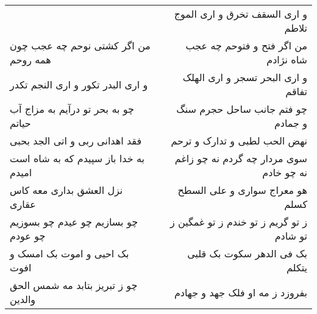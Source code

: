 \begin{center}
\begin{longtable}{l p{0.5cm} r}
&&
و اری السقف تخرق و اری الموج تلاطم
\\
من اگر کشتی نوحم چه عجب چون همه روحم
&&
من اگر فتح و فتوحم چه عجب شاه نژادم
\\
و اری البدر تکور و اری النجم تکدر
&&
و اری البحر تسجر و اری الهلک تفاقم
\\
چو به بحر تو درآیم به مزاج آب حیاتم
&&
چو فتم جانب ساحل حجرم سنگ و جمادم
\\
فقد اهدانی ربی و اتی الجد بحبی
&&
نهض الحب لطبی و تدارک و ترحم
\\
به خدا باز سپیدم که به شاه است امیدم
&&
سوی مردار چه گردم نه چو زاغم نه چو خادم
\\
نزل العشق بداری معه کاس عقاری
&&
هو معراج سواری و علی السطح کسلم
\\
چو بسازیم چو عیدم چو بسوزیم چو عودم
&&
ز تو گریم ز تو خندم ز تو غمگین ز تو شادم
\\
بک احیی و اموت بک امسک و افوت
&&
بک فی الدهر سکوت بک قلبی یتکلم
\\
چو ز تبریز بتابد مه شمس الحق والدین
&&
بفروزد ز مه او فلک جهد و جهادم
\\
\end{longtable}
\end{center}
